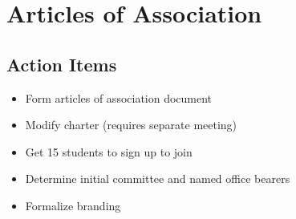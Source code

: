 \section{Articles of Association}
\label{sec:ArticlesOfAssociation}
\subsection{Action Items}
\begin{itemize}
  \item Form articles of association document
  \item Modify charter (requires separate meeting)
  \item Get 15 students to sign up to join
  \item Determine initial committee and named office bearers
  \item Formalize branding
\end{itemize}